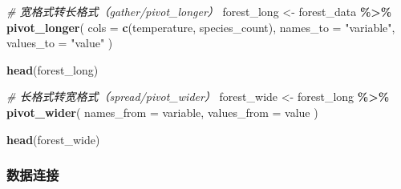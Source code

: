 \documentclass[
  twoside]{book}
\newenvironment{Shaded}{\begin{snugshade}}{\end{snugshade}}
\newcommand{\AttributeTok}[1]{\textcolor[rgb]{0.13,0.29,0.53}{#1}}
\newcommand{\CommentTok}[1]{\textcolor[rgb]{0.56,0.35,0.01}{\textit{#1}}}
\newcommand{\FunctionTok}[1]{\textcolor[rgb]{0.13,0.29,0.53}{\textbf{#1}}}
\newcommand{\NormalTok}[1]{#1}
\newcommand{\OtherTok}[1]{\textcolor[rgb]{0.56,0.35,0.01}{#1}}
\newcommand{\SpecialCharTok}[1]{\textcolor[rgb]{0.81,0.36,0.00}{\textbf{#1}}}
\newcommand{\StringTok}[1]{\textcolor[rgb]{0.31,0.60,0.02}{#1}}
\begin{document}
\begin{Shaded}
\begin{Highlighting}[]
\CommentTok{\# 宽格式转长格式（gather/pivot\_longer）}
\NormalTok{forest\_long }\OtherTok{\textless{}{-}}\NormalTok{ forest\_data }\SpecialCharTok{\%\textgreater{}\%}
  \FunctionTok{pivot\_longer}\NormalTok{(}
    \AttributeTok{cols =} \FunctionTok{c}\NormalTok{(temperature, species\_count),}
    \AttributeTok{names\_to =} \StringTok{"variable"}\NormalTok{,}
    \AttributeTok{values\_to =} \StringTok{"value"}
\NormalTok{  )}

\FunctionTok{head}\NormalTok{(forest\_long)}

\CommentTok{\# 长格式转宽格式（spread/pivot\_wider）}
\NormalTok{forest\_wide }\OtherTok{\textless{}{-}}\NormalTok{ forest\_long }\SpecialCharTok{\%\textgreater{}\%}
  \FunctionTok{pivot\_wider}\NormalTok{(}
    \AttributeTok{names\_from =}\NormalTok{ variable,}
    \AttributeTok{values\_from =}\NormalTok{ value}
\NormalTok{  )}

\FunctionTok{head}\NormalTok{(forest\_wide)}
\end{Highlighting}
\end{Shaded}

\hypertarget{ux6570ux636eux8fdeux63a5}{%
\subsubsection{数据连接}\label{ux6570ux636eux8fdeux63a5}}
\end{document}
